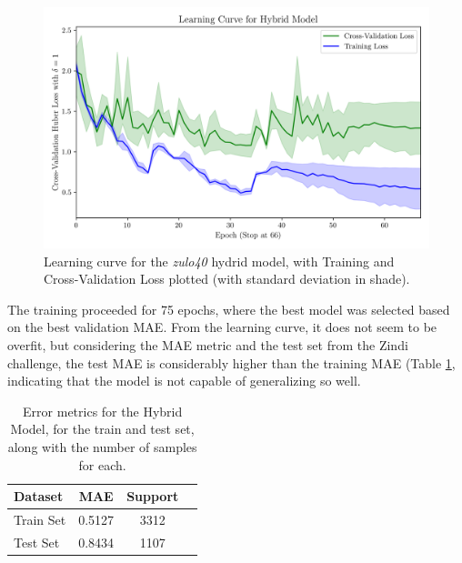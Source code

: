 \documentclass[conference]{IEEEtran}
\begin{document}


\begin{figure}[H]
    \centering
    \includegraphics[width=1\linewidth]{assets/model01_lc.png}
    \caption{Learning curve for the \textit{zulo40} hydrid model, with Training and Cross-Validation Loss plotted (with standard deviation in shade).}
    \label{fig:model01_lc}
\end{figure}


The training proceeded for 75 epochs, where the best model was selected based on the best validation MAE. From the learning curve, it does not seem to be overfit, but considering the MAE metric and the test set from the Zindi challenge, the test MAE is considerably higher than the training MAE (Table \ref{tab:model01_results}, indicating that the model is not capable of generalizing so well.



\begin{table}[H]
\centering
\caption{Error metrics for the Hybrid Model, for the train and test set, along with the number of samples for each.}
\label{tab:model01_results}
\begin{tabular}{lccc}
\toprule
\textbf{Dataset} & \textbf{MAE} & \textbf{Support} \\
\midrule
Train Set & 0.5127 & 3312 \\
Test Set & 0.8434 & 1107 \\
\bottomrule
\end{tabular}
\end{table}
\end{document}
